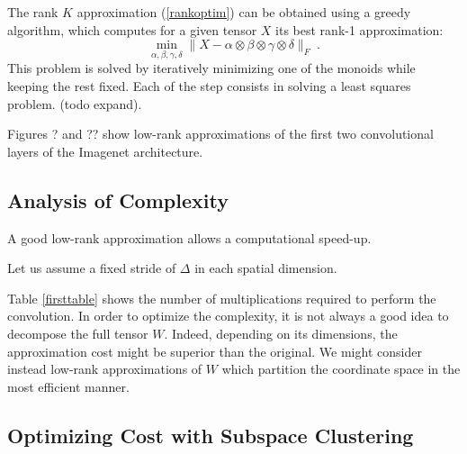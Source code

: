 \documentclass{article}
\begin{document}
The rank $K$ approximation (\ref{rankoptim}) can be obtained using a greedy 
algorithm, which computes for a given tensor $X$ its best rank-1 approximation:
\begin{equation}
\label{pla}
\min_{\alpha, \beta, \gamma, \delta} \| X - \alpha \otimes \beta \otimes \gamma \otimes \delta \|_F ~.
\end{equation}
This problem is solved by iteratively minimizing one of the monoids while keeping 
the rest fixed. Each of the step consists in solving a least squares problem. (todo expand).

Figures ? and ?? show low-rank approximations of the first two convolutional
layers of the Imagenet architecture.


\subsection{Analysis of Complexity}

A good low-rank approximation allows a computational speed-up. 

Let us assume a fixed stride of $\Delta$ in each spatial dimension. 


Table \ref{firsttable} shows the number of multiplications required to perform the 
convolution. In order to optimize the complexity, it is not always a good idea 
to decompose the full tensor $W$. Indeed, depending on its dimensions, 
the approximation cost might be superior than the original.
We might consider instead low-rank approximations of $W$ 
which partition the coordinate space in the most efficient manner.

\subsection{Optimizing Cost with Subspace Clustering}
\end{document}
